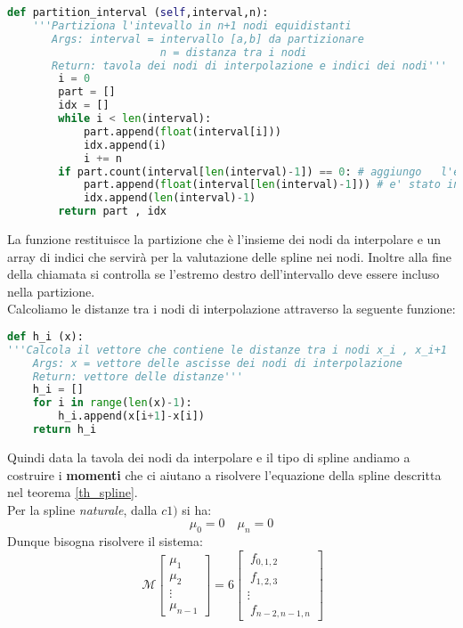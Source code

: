 \documentclass[a4paper,12pt]{report}
\theoremstyle{definition}
\begin{document}
\begin{lstlisting}[language=Python] 
	def partition_interval (self,interval,n):
	'''Partiziona l'intevallo in n+1 nodi equidistanti
	   Args: interval = intervallo [a,b] da partizionare
						n = distanza tra i nodi
	   Return: tavola dei nodi di interpolazione e indici dei nodi'''
		i = 0
		part = []
		idx = []
		while i < len(interval):
			part.append(float(interval[i]))
			idx.append(i)
			i += n
		if part.count(interval[len(interval)-1]) == 0: # aggiungo	l'estremo dell'intervallo se non
			part.append(float(interval[len(interval)-1])) # e' stato incluso nella tavola
			idx.append(len(interval)-1)
		return part , idx
\end{lstlisting}
La funzione restituisce la partizione che è l'insieme dei nodi da interpolare e un array di indici che servirà per la valutazione delle spline nei nodi. Inoltre alla fine della chiamata si controlla se l'estremo destro dell'intervallo deve essere incluso nella partizione.\\
Calcoliamo le distanze tra i nodi di interpolazione attraverso la seguente funzione:
\begin{lstlisting}[language=Python]
def h_i (x):
'''Calcola il vettore che contiene le distanze tra i nodi x_i , x_i+1
	Args: x = vettore delle ascisse dei nodi di interpolazione
	Return: vettore delle distanze'''
	h_i = []
	for i in range(len(x)-1):
		h_i.append(x[i+1]-x[i])
	return h_i
\end{lstlisting}
Quindi data la tavola dei nodi da interpolare e il tipo di spline andiamo a costruire i \textbf{momenti} che ci aiutano a risolvere l'equazione della spline descritta nel teorema \ref{th_spline}.\\
Per la spline \textit{naturale}, dalla $c1)$ si ha: $$\mu_0 = 0 \quad \mu_n = 0$$
Dunque bisogna risolvere il sistema:\\
\begin{displaymath}
\ \mathcal{M}
\left[ \begin{array}{ccc}
\mu_{1} \\
\mu_{2} \\
\vdots \\
\mu_{n-1}
\end{array} \right] = 6
\left[ \begin{array}{ccc}
\ f_{0,1,2} \\
\ f_{1,2,3} \\
\vdots \\
\ f_{n-2,n-1,n}
\end{array} \right]
\end{displaymath}
\end{document}
